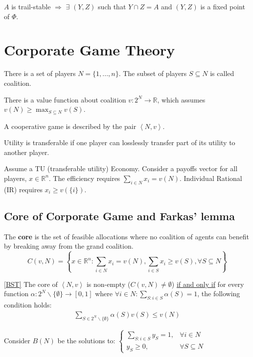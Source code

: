 \documentclass[11pt]{elegantbook}
\begin{document}
\begin{proposition}
    $A$ is trail-stable $\Rightarrow$ $\exists$ $(Y,Z)$ such that $Y\cap Z=A$ and $(Y,Z)$ is a fixed point of $\Phi$.
\end{proposition}


\section{Corporate Game Theory}
There is a set of players $N=\{1,...,n\}$. The subset of players $S\subseteq N$ is called coalition.

There is a value function about coalition $v: 2^N \rightarrow \mathbb{R}$, which assumes $v(N)\geq \max_{S\subseteq N}v(S)$.

\begin{definition}
    \normalfont
    A cooperative game is described by the pair $\left<N,v\right>$.
\end{definition}

\begin{definition}
    \normalfont
    Utility is transferable if one player can losslessly transfer part of its utility to another player.
\end{definition}
Assume a TU (transferable utility) Economy. Consider a payoffs vector for all players, $x\in \mathbb{R}^n$. The efficiency requires $\sum_{i\in N}x_i=v(N)$. Individual Rational (IR) requires $x_i\geq v(\{i\})$.

\subsection{Core of Corporate Game and Farkas' lemma}
\begin{definition}[Core]
    \normalfont
    The \textbf{core} is the set of feasible allocations where no coalition of agents can benefit by breaking away from the grand coalition.
    $$C(v,N)=\left\{x\in \mathbb{R}^n: \sum_{i\in N}x_i=v(N), \sum_{i\in S}x_i\geq v(S), \forall S\subseteq N\right\}$$
\end{definition}

\begin{theorem}\ref{BST}
    The core of $\left<N,v\right>$ is non-empty ($C(v,N)\neq \emptyset$) \underline{if and only if} for every function $\alpha: 2^N\backslash\{\emptyset\} \rightarrow [0,1]$ where $\forall i\in N: \sum_{S:i\in S}\alpha(S)=1$, the following condition holds:
    \begin{equation}
        \begin{aligned}
            \sum_{S\in 2^N\backslash\{\emptyset\}}\alpha(S) v(S)\leq v(N)
        \end{aligned}
        \nonumber
    \end{equation}
\end{theorem}
Consider $B(N)$ be the solutions to: $\left\{\begin{matrix}
    \sum_{S:i\in S}y_S=1,&\forall i\in N\\
    y_S\geq 0,& \forall S\subseteq N
\end{matrix}\right.$
\end{document}
